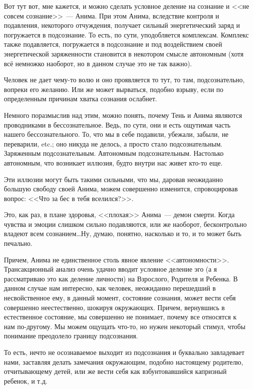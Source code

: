 \documentclass[a4paper,14pt,oneside]{memoir}
\begin{document}
Вот тут вот, мне кажется, и можно сделать условное деление на сознание и <<не совсем сознание>>~--- Анима. При этом Анима, вследствие контроля и подавления, некоторого отчуждения, получает сильный энергетический заряд и погружается в подсознание. То есть, по сути, уподобляется комплексам. Комплекс также подавляется, погружается в подсознание и под воздействием своей энергетической заряженности становится в некотором смысле автономным (хотя всё немножко наоборот, но в данном случае это не так важно).

Человек не дает чему-то волю и оно проявляется то тут, то там, подсознательно, вопреки его желанию. Или же может вырваться, подобно взрыву, если по определенным причинам хватка сознания ослабнет.

Немного поразмыслив над этим, можно понять, почему Тень и Анима являются проводниками в бессознательное. Ведь, по сути, они и есть ощутимая часть нашего бессознательного. То, что мы в себе подавили, убежали, забыли, не переварили, etc.; оно никуда не делось, а просто стало подсознательным. Заряженным подсознательным. Автономным подсознательным. Настолько автономным, что возникает иллюзия, будто внутри нас живет кто-то еще.

Эти иллюзии могут быть такими сильными, что мы, даровав неожиданно большую свободу своей Анима, можем совершенно изменится, спровоцировав вопрос: <<Что за бес в тебя вселился?>>.

Это, как раз, в плане здоровья, <<плохая>> Анима~--- демон смерти. Когда чувства и эмоции слишком сильно подавляются, или же наоборот, бесконтрольно владеют всем сознанием\ldots Ну, думаю, понятно, насколько и то, и то может быть печально.

Причем, Анима не единственное столь явное явление <<автономности>>. Трансакционный анализ очень удачно вводит условное деление эго (а я рассматриваю это как деление личности) на Взрослого, Родителя и Ребенка. В данном случае нам интересно, как человек, неожиданно перешедший в несвойственное ему, в данный момент, состояние сознания, может вести себя совершенно неестественно, шокируя окружающих. Причем, вернувшись в естественное состояние, мы совершенно не понимает, почему все относятся к нам по-другому. Мы можем ощущать что-то, но нужен некоторый стимул, чтобы понимание преодолело границу подсознания.

То есть, нечто не осознаваемое выходит из подсознания и буквально завладевает нами, заставляя делать замечания окружающим, подобно настоящему родителю, отчитывающему детей, или же вести себя как взбунтовавшийся капризный ребенок, и т.д.
\end{document}

